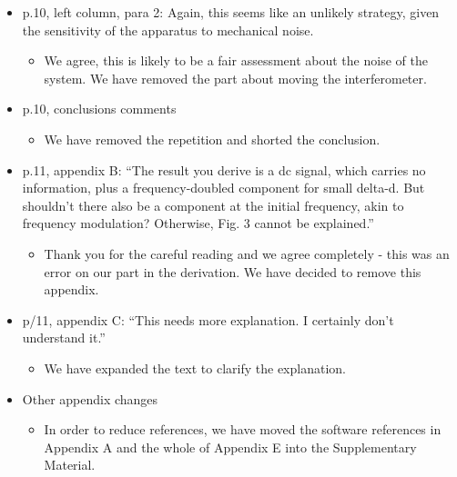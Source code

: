 \documentclass[a4paper, 10pt]{letter}
\begin{document}
\begin{itemize}
\item p.10, left column, para 2: Again, this seems like an unlikely strategy, given the sensitivity of the apparatus to mechanical noise. 
\begin{itemize}
\item We agree, this is likely to be a fair assessment about the noise of the system. We have removed the part about moving the interferometer. 
\end{itemize}

\item p.10, conclusions comments
\begin{itemize}
\item We have removed the repetition and shorted the conclusion. 
\end{itemize}

\item p.11, appendix B: ``The result you derive is a dc signal, which carries no information, plus a frequency-doubled component for small delta-d. But shouldn't there also be a component at the initial frequency, akin to frequency modulation? Otherwise, Fig. 3 cannot be explained.''
\begin{itemize}
\item Thank you for the careful reading and we agree completely - this was an error on our part in the derivation. We have decided to remove this appendix. 
\end{itemize}

\item p/11, appendix C: ``This needs more explanation. I certainly don't understand it.''
\begin{itemize}
\item We have expanded the text to clarify the explanation. 
\end{itemize}

\item Other appendix changes
\begin{itemize}
\item In order to reduce references, we have moved the software references in Appendix A and the whole of Appendix E into the Supplementary Material. 
\end{itemize}

\end{itemize}
\end{document}
